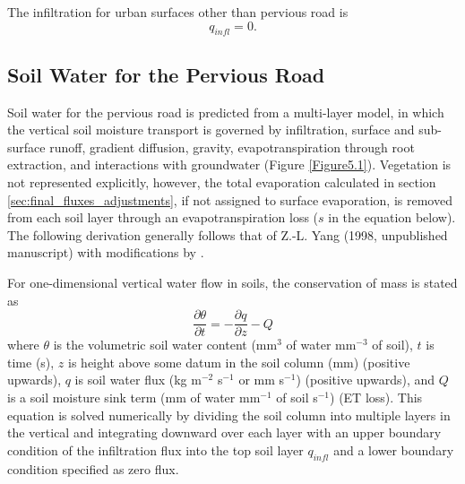 \documentclass[12pt,authoryear]{elsarticle}
\numberwithin{equation}{section} %
\begin{document}
The infiltration for urban surfaces other than pervious road is
\begin{equation}
q_{infl} = 0.
\end{equation}

\subsection{Soil Water for the Pervious Road}
\label{sec:soil_water_pervious_road}
%
Soil water for the pervious road is predicted from a multi-layer model, in which the vertical soil moisture transport is governed by infiltration, surface and sub-surface runoff, gradient diffusion, gravity, evapotranspiration through root extraction, and interactions with groundwater (Figure \ref{Figure5.1}). Vegetation is not represented explicitly, however, the total evaporation calculated in section \ref{sec:final_fluxes_adjustments}, if not assigned to surface evaporation, is removed from each soil layer through an evapotranspiration loss ($s$ in the equation below). The following derivation generally follows that of Z.-L. Yang (1998, unpublished manuscript) with modifications by \cite{zengImprovingNumericalSolution2009}.

For one-dimensional vertical water flow in soils, the conservation of mass is stated as
\begin{equation}
\label{eq:conversation_water_flow}
\frac{\partial \theta}{\partial t} = -\frac{\partial q}{\partial z} -Q
\end{equation}
where $\theta$ is the volumetric soil water content (mm$^3$ of 
water mm$^{-3}$ of soil), $t$ is time (s), $z$ is height above some datum in the soil column (mm) (positive upwards), $q$ is soil water flux (kg m$^{-2}$ s$^{-1}$ or mm s$^{-1}$) (positive upwards), and $Q$ is a soil moisture sink term (mm of water mm$^{-1}$ of soil s$^{-1}$) (ET loss). This equation is solved numerically by dividing the soil column into multiple layers in the vertical and integrating downward over each layer with an upper boundary condition of the infiltration flux into the top soil layer $q_{infl}$ and a lower boundary condition specified as zero flux.
\end{document}
